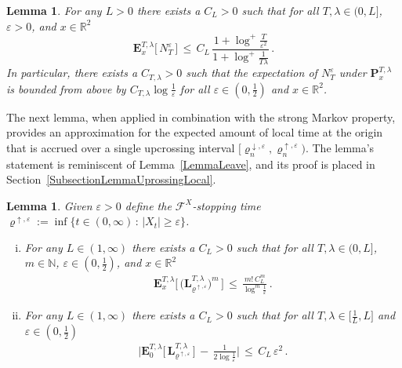 \documentclass[10pt]{article}
\numberwithin{equation}{section}
\newtheorem{lemma}[theorem]{Lemma}
\theoremstyle{definition}
\newcommand{\R}{{\mathbb R}}
\begin{document}
\begin{lemma}\label{UpcroossingInequalityPre}  For any $L>0$ there exists a  $C_L>0$ such that for all $T,\lambda\in (0,L]$, $\varepsilon>0$, and $x\in \R^2$
$$   \mathbf{E}^{T,\lambda}_{x}\big[\, N_{T}^{\varepsilon}\,\big] \,\leq \,C_L \,\frac{ 1+\log^+\frac{T}{\varepsilon^2 }  }{1+\log^+ \frac{1}{T\lambda} }  \,. $$
In particular, there exists a $C_{T,\lambda}>0$ such that the expectation of $N_{T}^{\varepsilon}$ under $\mathbf{P}^{T,\lambda}_{x}$ is bounded from above by $ C_{T,\lambda}\log \frac{1}{\varepsilon} $ for all $\varepsilon\in (0,\frac{1}{2})$ and $x\in \R^2$.
\end{lemma}





The next lemma, when applied in combination with the strong Markov property,  provides an approximation for the expected amount of  local time at the origin that is accrued over a single upcrossing interval $\big[\varrho_{n}^{\downarrow,\varepsilon}, \varrho_{n}^{\uparrow,\varepsilon}\big)$. The lemma's statement is reminiscent of Lemma~\ref{LemmaLeave}, and its proof is placed in Section~\ref{SubsectionLemmaUprossingLocal}.
\begin{lemma}\label{LemmaUprossingLocal} Given $\varepsilon>0$ define the $\mathscr{F}^X$-stopping time $\varrho^{\uparrow, \varepsilon}:= \inf\{t\in (0,\infty)\,:\, |X_t|\geq \varepsilon \}$. 
\begin{enumerate}[(i)]

\item  For any $L\in (1,\infty)$ there exists a  $C_{L}>0$ such that for all  $T,\lambda \in (0, L]$, $m\in \mathbb{N}$,  $\varepsilon\in (0,\frac{1}{2})$, and $x\in \R^2$
\begin{align}\label{BaseII}
\mathbf{E}^{T,\lambda}_{x}\Big[\,\big(\mathbf{L}_{\varrho^{\uparrow, \varepsilon} }^{T,\lambda}\big)^m\,\Big]\,\leq \,\frac{ m!\, C_L^m  }{\log^m \frac{1}{\varepsilon} }   \,.
\end{align}

\item For any $L\in (1,\infty)$ there exists a  $C_{L}>0$ such that for all $T,\lambda \in \big[\frac{1}{L}, L\big]$ and  $\varepsilon\in (0,\frac{1}{2})$
\begin{align*}
\bigg| \mathbf{E}^{T,\lambda}_{0}\Big[ \,\mathbf{L}_{\varrho^{\uparrow, \varepsilon} }^{T,\lambda} \,\Big]\,-\,\frac{ 1 }{2\log \frac{1}{\varepsilon} }    \bigg| \,\leq \, C_{L}\,\varepsilon^2   \,.
\end{align*}


\end{enumerate}



\end{lemma}
\end{document}
